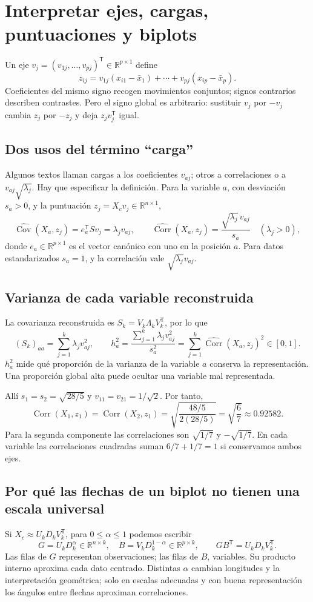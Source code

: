 \documentclass[11pt,a4paper]{article}
\newcommand{\R}{\mathbb R}
\newcommand{\T}{^{\mathsf T}}
\DeclareMathOperator{\Cov}{Cov}
\DeclareMathOperator{\Corr}{Corr}
\theoremstyle{definition}
\begin{document}
\section{Interpretar ejes, cargas, puntuaciones y biplots}
Un eje $v_j=(v_{1j},\ldots,v_{pj})\T\in\R^{p\times1}$ define
\[
z_{ij}=v_{1j}(x_{i1}-\bar x_1)+\cdots+v_{pj}(x_{ip}-\bar x_p).
\]
Coeficientes del mismo signo recogen movimientos conjuntos; signos contrarios describen contrastes. Pero el signo global es arbitrario: sustituir $v_j$ por $-v_j$ cambia $z_j$ por $-z_j$ y deja $z_jv_j\T$ igual.
\subsection{Dos usos del término ``carga''}
Algunos textos llaman cargas a los coeficientes $v_{aj}$; otros a correlaciones o a $v_{aj}\sqrt{\lambda_j}$. Hay que especificar la definición. Para la variable $a$, con desviación $s_a>0$, y la puntuación $z_j=X_cv_j\in\R^{n\times1}$,
\[
\widehat{\Cov}(X_a,z_j)=e_a\T Sv_j=\lambda_jv_{aj},\qquad
\boxed{\widehat{\Corr}(X_a,z_j)=\frac{\sqrt{\lambda_j}\,v_{aj}}{s_a}}
\quad(\lambda_j>0),
\]
donde $e_a\in\R^{p\times1}$ es el vector canónico con uno en la posición $a$. Para datos estandarizados $s_a=1$, y la correlación vale $\sqrt{\lambda_j}v_{aj}$.
\subsection{Varianza de cada variable reconstruida}
La covarianza reconstruida es $S_k=V_k\Lambda_kV_k\T$, por lo que
\[
(S_k)_{aa}=\sum_{j=1}^k\lambda_jv_{aj}^2,\qquad
h_a^2=\frac{\sum_{j=1}^k\lambda_jv_{aj}^2}{s_a^2}
=\sum_{j=1}^k\widehat{\Corr}(X_a,z_j)^2\in[0,1].
\]
$h_a^2$ mide qué proporción de la varianza de la variable $a$ conserva la representación. Una proporción global alta puede ocultar una variable mal representada.
\begin{ejemplo}
Allí $s_1=s_2=\sqrt{28/5}$ y $v_{11}=v_{21}=1/\sqrt2$. Por tanto,
\[
\Corr(X_1,z_1)=\Corr(X_2,z_1)=\sqrt{\frac{48/5}{2(28/5)}}=\sqrt{\frac67}\approx0.92582.
\]
Para la segunda componente las correlaciones son $\sqrt{1/7}$ y $-\sqrt{1/7}$. En cada variable las correlaciones cuadradas suman $6/7+1/7=1$ si conservamos ambos ejes.
\end{ejemplo}
\subsection{Por qué las flechas de un biplot no tienen una escala universal}
Si $X_c\approx U_kD_kV_k\T$, para $0\le\alpha\le1$ podemos escribir
\[
G=U_kD_k^\alpha\in\R^{n\times k},\quad B=V_kD_k^{1-\alpha}\in\R^{p\times k},\qquad
GB\T=U_kD_kV_k\T.
\]
Las filas de $G$ representan observaciones; las filas de $B$, variables. Su producto interno aproxima cada dato centrado. Distintas $\alpha$ cambian longitudes y la interpretación geométrica; solo en escalas adecuadas y con buena representación los ángulos entre flechas aproximan correlaciones.
\end{document}
